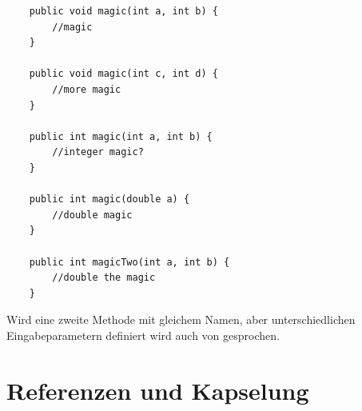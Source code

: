 \documentclass{article}
\begin{document}
\begin{verbatim}
    public void magic(int a, int b) {
        //magic
    }

    public void magic(int c, int d) {
        //more magic
    }

    public int magic(int a, int b) {
        //integer magic?
    }

    public int magic(double a) {
        //double magic
    }

    public int magicTwo(int a, int b) {
        //double the magic
    }
\end{verbatim}
Wird eine zweite Methode mit gleichem Namen, aber unterschiedlichen Eingabeparametern definiert wird auch von  gesprochen. 
\newpage

\section{Referenzen und Kapselung}
\end{document}
